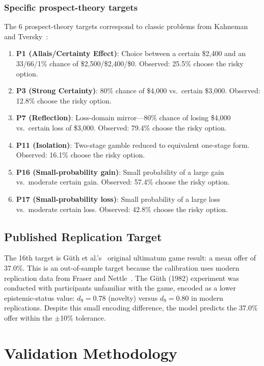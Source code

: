 \documentclass[journal]{IEEEtran}
\begin{document}
\subsubsection{Specific prospect-theory targets}
The 6 prospect-theory targets correspond to classic problems from Kahneman and Tversky~\cite{kahneman1979}:
\begin{enumerate}
    \item \textbf{P1 (Allais/Certainty Effect)}: Choice between a certain \$2,400 and an 33/66/1\% chance of \$2,500/\$2,400/\$0. Observed: 25.5\% choose the risky option.
    \item \textbf{P3 (Strong Certainty)}: 80\% chance of \$4,000 vs.\ certain \$3,000. Observed: 12.8\% choose the risky option.
    \item \textbf{P7 (Reflection)}: Loss-domain mirror---80\% chance of losing \$4,000 vs.\ certain loss of \$3,000. Observed: 79.4\% choose the risky option.
    \item \textbf{P11 (Isolation)}: Two-stage gamble reduced to equivalent one-stage form. Observed: 16.1\% choose the risky option.
    \item \textbf{P16 (Small-probability gain)}: Small probability of a large gain vs.\ moderate certain gain. Observed: 57.4\% choose the risky option.
    \item \textbf{P17 (Small-probability loss)}: Small probability of a large loss vs.\ moderate certain loss. Observed: 42.8\% choose the risky option.
\end{enumerate}

\subsection{Published Replication Target}

The 16th target is G\"uth et al.'s~\cite{guth1982} original ultimatum game result: a mean offer of 37.0\%.
This is an out-of-sample target because the calibration uses modern replication data from Fraser and Nettle~\cite{fraser2020}.
The G\"uth (1982) experiment was conducted with participants unfamiliar with the game, encoded as a lower epistemic-status value: $d_9 = 0.78$ (novelty) versus $d_9 = 0.80$ in modern replications.
Despite this small encoding difference, the model predicts the 37.0\% offer within the $\pm$10\% tolerance.


\section{Validation Methodology}
\label{sec:validation}
\end{document}
